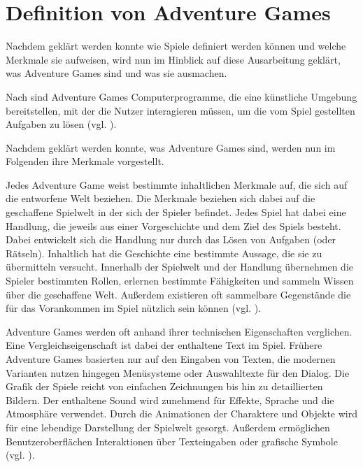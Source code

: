 
\section{Definition von Adventure Games}

Nachdem geklärt werden konnte wie Spiele definiert werden können und welche Merkmale sie aufweisen, wird nun im Hinblick auf diese Ausarbeitung geklärt, was Adventure Games sind und was sie ausmachen.

Nach \cite{cavallari_adventure_1992} sind Adventure Games Computerprogramme, die eine künstliche Umgebung bereitstellen, mit der die Nutzer interagieren müssen, um die vom Spiel gestellten Aufgaben zu lösen (vgl. \citealp[S. 173]{cavallari_adventure_1992}). 

Nachdem geklärt werden konnte, was Adventure Games sind, werden nun im Folgenden ihre Merkmale vorgestellt.

Jedes Adventure Game weist bestimmte inhaltlichen Merkmale auf, die sich auf die entworfene Welt beziehen. Die Merkmale beziehen sich dabei auf die geschaffene Spielwelt in der sich der Spieler befindet. Jedes Spiel hat dabei eine Handlung, die jeweils aus einer Vorgeschichte und dem Ziel des Spiels besteht. Dabei entwickelt sich die Handlung nur durch das Lösen von Aufgaben (oder Rätseln). Inhaltlich hat die Geschichte eine bestimmte Aussage, die sie zu übermitteln versucht. Innerhalb der Spielwelt und der Handlung übernehmen die Spieler bestimmten Rollen, erlernen bestimmte Fähigkeiten und sammeln Wissen über die geschaffene Welt. Außerdem existieren oft sammelbare Gegenstände die für das Vorankommen im Spiel nützlich sein können (vgl. \citealp[S. 174f]{cavallari_adventure_1992}).

Adventure Games werden oft anhand ihrer technischen Eigenschaften verglichen. 
Eine Vergleichseigenschaft ist dabei der enthaltene Text im Spiel. Frühere Adventure Games basierten nur auf den Eingaben von Texten, die modernen Varianten nutzen hingegen Menüsysteme oder Auswahltexte für den Dialog. Die Grafik der Spiele reicht von einfachen Zeichnungen bis hin zu detaillierten Bildern. Der enthaltene Sound wird zunehmend für Effekte, Sprache und die Atmosphäre verwendet. Durch die Animationen der Charaktere und Objekte wird für eine lebendige Darstellung der Spielwelt gesorgt. Außerdem ermöglichen Benutzeroberflächen Interaktionen über Texteingaben oder grafische Symbole (vgl. \citealp[S. 175ff]{cavallari_adventure_1992}).

